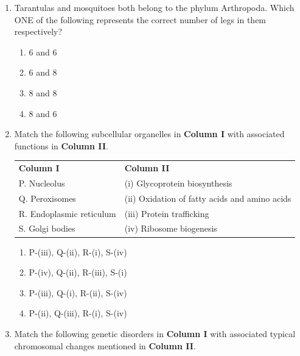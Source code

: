 \documentclass[journal,12pt,onecolumn]{IEEEtran}
\begin{document}
\begin{enumerate}[label=\arabic*.,resume]

\item Tarantulas and mosquitoes both belong to the phylum Arthropoda. Which ONE of the following represents the correct number of legs in them respectively?

\begin{multicols}{4}
\begin{enumerate}[label=(\Alph*)]
\item 6 and 6
\item 6 and 8
\item 8 and 8
\item 8 and 6
\end{enumerate}
\end{multicols}

\item Match the following subcellular organelles in \textbf{Column I} with associated functions in \textbf{Column II}.

\begin{table}[H]
\centering
\begin{tabular}{ll}
\textbf{Column I} & \textbf{Column II} \\
P. Nucleolus & (i) Glycoprotein biosynthesis \\
Q. Peroxisomes & (ii) Oxidation of fatty acids and amino acids \\
R. Endoplasmic reticulum & (iii) Protein trafficking \\
S. Golgi bodies & (iv) Ribosome biogenesis \\
\end{tabular}
\end{table}

\begin{multicols}{2}
\begin{enumerate}[label=(\Alph*)]
\item P-(iii), Q-(ii), R-(i), S-(iv)
\item P-(iv), Q-(ii), R-(iii), S-(i)
\item P-(iii), Q-(i), R-(ii), S-(iv)
\item P-(ii), Q-(iii), R-(i), S-(iv)
\end{enumerate}
\end{multicols}

\item Match the following genetic disorders in \textbf{Column I} with associated typical chromosomal changes mentioned in \textbf{Column II}.


\end{enumerate}
\end{document}
